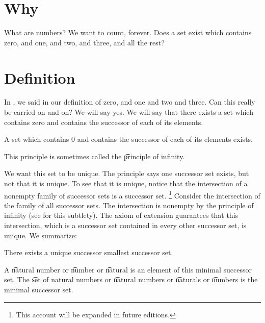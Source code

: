 
\section*{Why}

What are numbers?
We want to count, forever.
Does a set exist which contains zero, and one, and two, and three, and all the rest?

\section*{Definition}

In ,
we said  in our definition of zero, and one and two and three.
Can this really be carried on and on?
We will say yes.
We will say that there exists a set which contains zero and contains the successor of each of its elements.

\begin{principle}A set which contains 0 and contains the successor of each of its elements exists.\end{principle}
This principle is sometimes called the \t{principle of infinity}.

We want this set to be unique.
The principle says one successor set exists, but not that it is unique.
To see that it is unique, notice that the intersection of a nonempty family of successor sets is a successor set.
  \ifhmode\unskip\fi\footnote{
This account will be expanded in future editions.
  }
Consider the intersection of the family of all successor sets.
The intersection is nonempty by the principle of infinity (see  for this subtlety).
The axiom of extension guarantees that this intersection, which is a successor set contained in every other successor set, is unique.
We summarize:

\begin{proposition}
  \label{natural_numbers:proposition:omega}There exists a unique successor smallest successor set.\end{proposition}
A \t{natural number} or \t{number} or \t{natural} is an element of this minimal successor set.
The \t{set of natural numbers} or \t{natural numbers} or \t{naturals} or \t{numbers} is the minimal successor set.

